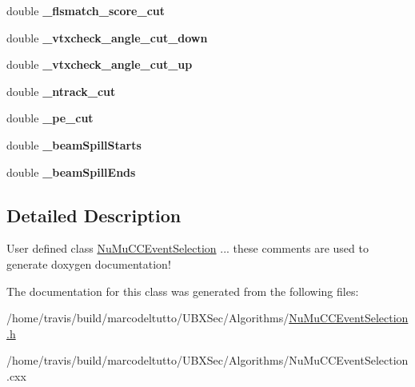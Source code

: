 \begin{DoxyCompactItemize}
\item 
\hypertarget{classubana_1_1NuMuCCEventSelection_ab3b2bd085e4d94041d4606004e7e7c84}{double {\bfseries \-\_\-flsmatch\-\_\-score\-\_\-cut}}\label{classubana_1_1NuMuCCEventSelection_ab3b2bd085e4d94041d4606004e7e7c84}

\item 
\hypertarget{classubana_1_1NuMuCCEventSelection_ab3d603d87565634367e9c1b0a432e768}{double {\bfseries \-\_\-vtxcheck\-\_\-angle\-\_\-cut\-\_\-down}}\label{classubana_1_1NuMuCCEventSelection_ab3d603d87565634367e9c1b0a432e768}

\item 
\hypertarget{classubana_1_1NuMuCCEventSelection_aecedda900c5db3ae97a2a56d2b2ca0ce}{double {\bfseries \-\_\-vtxcheck\-\_\-angle\-\_\-cut\-\_\-up}}\label{classubana_1_1NuMuCCEventSelection_aecedda900c5db3ae97a2a56d2b2ca0ce}

\item 
\hypertarget{classubana_1_1NuMuCCEventSelection_aedd8196829ba2459ec0cf3784f67bcb9}{double {\bfseries \-\_\-ntrack\-\_\-cut}}\label{classubana_1_1NuMuCCEventSelection_aedd8196829ba2459ec0cf3784f67bcb9}

\item 
\hypertarget{classubana_1_1NuMuCCEventSelection_abad9fc8197e1d13ee7f35551cedeacaa}{double {\bfseries \-\_\-pe\-\_\-cut}}\label{classubana_1_1NuMuCCEventSelection_abad9fc8197e1d13ee7f35551cedeacaa}

\item 
\hypertarget{classubana_1_1NuMuCCEventSelection_af08a0c70e21fbef10efd34dde2fe7d83}{double {\bfseries \-\_\-beam\-Spill\-Starts}}\label{classubana_1_1NuMuCCEventSelection_af08a0c70e21fbef10efd34dde2fe7d83}

\item 
\hypertarget{classubana_1_1NuMuCCEventSelection_a2a52cfd60173c161bf9169cf26964eea}{double {\bfseries \-\_\-beam\-Spill\-Ends}}\label{classubana_1_1NuMuCCEventSelection_a2a52cfd60173c161bf9169cf26964eea}

\end{DoxyCompactItemize}


\subsection{Detailed Description}
User defined class \hyperlink{classubana_1_1NuMuCCEventSelection}{Nu\-Mu\-C\-C\-Event\-Selection} ... these comments are used to generate doxygen documentation! 

The documentation for this class was generated from the following files\-:\begin{DoxyCompactItemize}
\item 
/home/travis/build/marcodeltutto/\-U\-B\-X\-Sec/\-Algorithms/\hyperlink{NuMuCCEventSelection_8h}{Nu\-Mu\-C\-C\-Event\-Selection.\-h}\item 
/home/travis/build/marcodeltutto/\-U\-B\-X\-Sec/\-Algorithms/Nu\-Mu\-C\-C\-Event\-Selection.\-cxx\end{DoxyCompactItemize}
